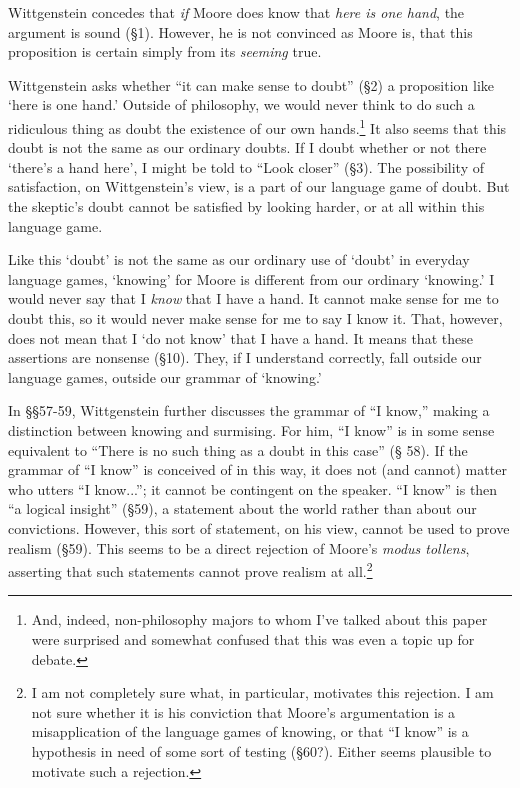 \documentclass[doc,12pt,apacite,biblatex]{apa6}
\begin{document}
Wittgenstein concedes that \emph{if} Moore does know that \emph{here is one
hand}, the argument is sound (\S 1). However, he is not convinced as Moore is,
that this proposition is certain simply from its \emph{seeming} true.

Wittgenstein asks whether ``it can make sense to doubt'' (\S 2) a proposition
like `here is one hand.' Outside of philosophy, we would never think to do such
a ridiculous thing as doubt the existence of our own hands.\footnote{And,
indeed, non-philosophy majors to whom I've talked about this paper were
surprised and somewhat confused that this was even a topic up for debate.}
It also seems that this doubt is not the same as our ordinary doubts. If I
doubt whether or not there `there's a hand here', I might be told to ``Look
closer'' (\S 3). The possibility of satisfaction, on Wittgenstein's view, is a
part of our language game of doubt. But the skeptic's doubt cannot be satisfied
by looking harder, or at all within this language game.

Like this `doubt' is not the same as our ordinary use of `doubt' in everyday
language games, `knowing' for Moore is different from our ordinary `knowing.' I
would never say that I \emph{know} that I have a hand. It cannot make sense for
me to doubt this, so it would never make sense for me to say I know it. That,
however, does not mean that I `do not know' that I have a hand. It means that
these assertions are nonsense (\S 10). They, if I understand correctly, fall
outside our language games, outside our grammar of `knowing.'

In \S\S 57-59, Wittgenstein further discusses the grammar of ``I know,''
making a distinction between knowing and surmising. For him, ``I know'' is in
some sense equivalent to ``There is no such thing as a doubt in this case'' (\S
58). If the grammar of ``I know'' is conceived of in this way, it does not (and
cannot) matter who utters ``I know...''; it cannot be contingent on the
speaker. ``I know'' is then ``a logical insight'' (\S 59), a statement about
the world rather than about our convictions. However, this sort of statement,
on his view, cannot be used to prove realism (\S 59).  This seems to be a
direct rejection of Moore's \emph{modus tollens}, asserting that such
statements cannot prove realism at all.\footnote{I am not completely sure what,
in particular, motivates this rejection. I am not sure whether it is his
conviction that Moore's argumentation is a misapplication of the language games
of knowing, or that ``I know'' is a hypothesis in need of some sort of testing
(\S 60?). Either seems plausible to motivate such a rejection.}
\end{document}
